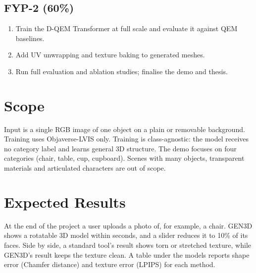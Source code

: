 \subsection{FYP-2 (60\%)}
\begin{enumerate}[leftmargin=*]
  \item Train the D-QEM Transformer at full scale and evaluate it against QEM baselines.
  \item Add UV unwrapping and texture baking to generated meshes.
  \item Run full evaluation and ablation studies; finalise the demo and thesis.
\end{enumerate}

\section{Scope}
Input is a single RGB image of one object on a plain or removable background. Training uses Objaverse-LVIS only. Training is class-agnostic: the model receives no category label and learns general 3D structure. The demo focuses on four categories (chair, table, cup, cupboard). Scenes with many objects, transparent materials and articulated characters are out of scope.

\section{Expected Results}
At the end of the project a user uploads a photo of, for example, a chair. GEN3D shows a rotatable 3D model within seconds, and a slider reduces it to 10\% of its faces. Side by side, a standard tool's result shows torn or stretched texture, while GEN3D's result keeps the texture clean. A table under the models reports shape error (Chamfer distance) and texture error (LPIPS) for each method.
